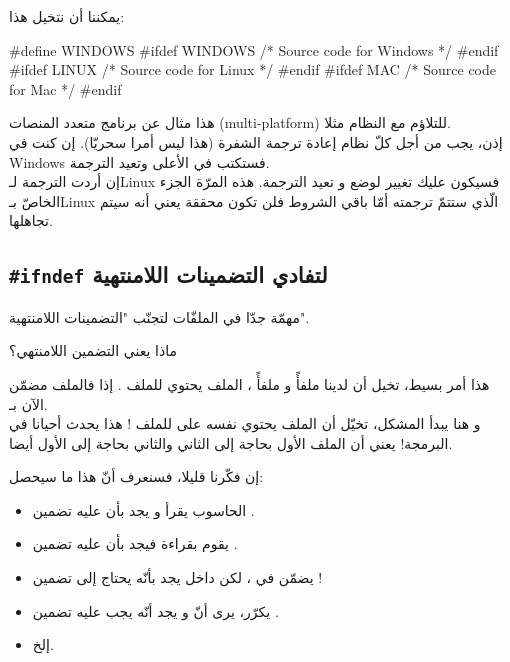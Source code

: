 يمكننا أن نتخيل هذا:
\begin{Csource}
#define WINDOWS
#ifdef WINDOWS
  /* Source code for Windows */
#endif
#ifdef LINUX
  /* Source code for Linux */
#endif
#ifdef MAC
  /* Source code for Mac */
#endif
\end{Csource}
هذا مثال عن برنامج متعدد المنصات
(\textenglish{multi-platform})
للتلاؤم مع النظام مثلا.\\
إذن، يجب من أجل كلّ نظام إعادة ترجمة الشفرة (هذا ليس أمرا سحريّا).
إن كنت في
\textenglish{Windows}
فستكتب
في الأعلى وتعيد الترجمة.\\
إن أردت الترجمة لـ\textenglish{Linux}
فسيكون عليك تغيير
لوضع
و تعيد الترجمة. هذه المرّة الجزء الخاصّ بـ\textenglish{Linux}
الّذي ستتمّ ترجمته أمّا باقي الشروط فلن تكون محققة يعني أنه سيتم تجاهلها.

\subsection{\texttt{\#ifndef} لتفادي التضمينات اللامنتهية}
مهمّة جدّا في الملفّات
لتجنّب "التضمينات اللامنتهية".
\begin{question}
  ماذا يعني التضمين اللامنتهي؟
\end{question}
هذا أمر بسيط، تخيل أن لدينا ملفأً
و ملفأً
،
الملف
يحتوي
للملف
.
إذا فالملف
مضمّن الآن بـ.\\
و هنا يبدأ المشكل، تخيّل أن الملف
يحتوي نفسه على
للملف
!
هذا يحدث أحيانا في البرمجة! يعني أن الملف الأول بحاجة إلى الثاني والثاني بحاجة إلى الأول أيضا.

إن فكّرنا قليلا، فسنعرف أنّ هذا ما سيحصل:
\begin{itemize}
  \item  الحاسوب يقرأ
و يجد بأن عليه تضمين
.
  \item يقوم بقراءة
فيجد بأن عليه تضمين
.
  \item  يضمّن
في
،
لكن داخل
يجد بأنّه يحتاج إلى تضمين
!
  \item يكرّر، يرى أنّ
و يجد أنّه يجب عليه تضمين
.
  \item إلخ.
\end{itemize}

